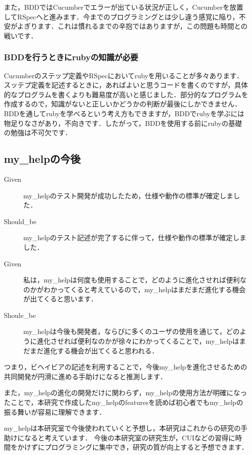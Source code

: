 また，BDDではCucumberでエラーが出ている状況が正しく，Cucumberを放置してRSpecへと進みます．今までのプログラミングとは少し違う感覚に陥り，不安がよぎります．これは慣れるまでの辛抱ではありますが，この問題も時間との戦いです．

\subsubsection{BDDを行うときにrubyの知識が必要}
Cucumberのステップ定義やRSpecにおいてrubyを用いることが多々あります．スッテプ定義を記述するときに，あればよいと思うコードを書くのですが，具体的なプログラムを書くよりも難易度が高いと感じました．部分的なプログラムを作成するので，知識がないと正しいかどうかの判断が最後にしかできません．BDDを通してrubyを学べるという考え方もできますが，BDDでrubyを学ぶには物足りなさがあり，不向きです．したがって，BDDを使用する前にrubyの基礎の勉強は不可欠です．

\subsection{my\_helpの今後}\begin{description}
\item[Given] my\_helpのテスト開発が成功したため，仕様や動作の標準が確定しました．

\item[Should\_be]  my\_helpのテスト記述が完了するに伴って，仕様や動作の標準が確定しました．

\end{description}\begin{description}
\item[Given] 私は，my\_helpは何度も使用することで，どのように進化させれば便利なのかがわかってくると考えているので，my\_helpはまだまだ進化する機会が出てくると思います．

\item[Shoule\_be] my\_helpは今後も開発者，ならびに多くのユーザの使用を通じて，どのように進化させれば便利なのかが徐々にわかってくることで，my\_helpはまだまだ進化する機会が出てくると思われる．

\end{description}
つまり，ビヘイビアの記述を利用することで，今後my\_helpを進化させるための共同開発が円滑に進める手助けになると推測します．

また，my\_helpの進化の開発だけに関わらず，my\_helpの使用方法が明確になったことで，本研究で作成したmy\_helpのfeaturesを読めば初心者でもmy\_helpの振る舞いが容易に理解できます．

my\_helpは本研究室で今後使われていくと予想し，本研究はこれからの研究の手助けになると考えています．
今後の本研究室の研究生が，CUIなどの習得に時間をかけずにプログラミングに集中でき，研究の質が向上すると予想できます．


